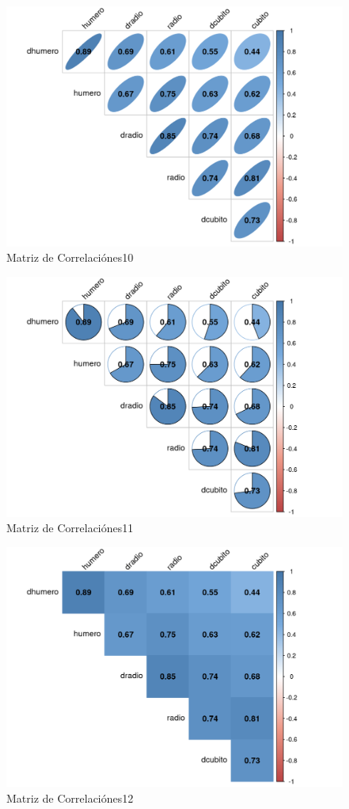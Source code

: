 \documentclass[12pt,a4paper,]{book}
\numberwithin{dummy}{section}
\theoremstyle{ocrenumbox}
\theoremstyle{ocrenumbox}
\theoremstyle{ocrenumbox}
\theoremstyle{ocrenumbox}
\theoremstyle{ocrenum}
\begin{document}
\begin{figure}[H]

{\centering \includegraphics[width=0.6\linewidth]{figurasR/grafica1r-1} 

}

\caption{Matriz de Correlaciónes10}\label{fig:grafica1r}
\end{figure}

\begin{figure}[H]

{\centering \includegraphics[width=0.6\linewidth]{figurasR/grafica1s-1} 

}

\caption{Matriz de Correlaciónes11}\label{fig:grafica1s}
\end{figure}

\begin{figure}[H]

{\centering \includegraphics[width=0.6\linewidth]{figurasR/grafica1t-1} 

}

\caption{Matriz de Correlaciónes12}\label{fig:grafica1t}
\end{figure}
\end{document}
